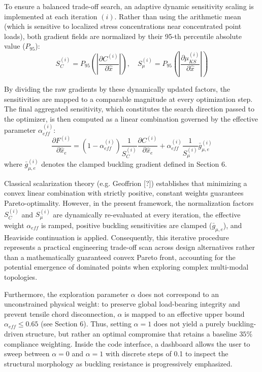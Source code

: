 \documentclass{article}
\begin{document}
To ensure a balanced trade-off search, an adaptive dynamic sensitivity scaling is implemented at each iteration $(i)$. Rather than using the arithmetic mean (which is sensitive to localized stress concentrations near concentrated point loads), both gradient fields are normalized by their 95-th percentile absolute value ($P_{95}$):
\begin{equation}
S_C^{(i)} = P_{95}\left(\left| \frac{\partial C^{(i)}}{\partial \hat{x}} \right|\right), \quad S_\mu^{(i)} = P_{95}\left(\left| \frac{\partial \mu_{KS}^{(i)}}{\partial \hat{x}} \right|\right)
\end{equation}

By dividing the raw gradients by these dynamically updated factors, the sensitivities are mapped to a comparable magnitude at every optimization step. The final aggregated sensitivity, which constitutes the search direction passed to the optimizer, is then computed as a linear combination governed by the effective parameter $\alpha_{eff}^{(i)}$:
\begin{equation}
\frac{\partial F^{(i)}}{\partial \hat{x}_e} = (1 - \alpha_{eff}^{(i)})\frac{1}{S_C^{(i)}}\frac{\partial C^{(i)}}{\partial \hat{x}_e} + \alpha_{eff}^{(i)} \frac{1}{S_\mu^{(i)}}\bar{g}_{\mu, e}^{(i)}
\end{equation}
where $\bar{g}_{\mu, e}^{(i)}$ denotes the clamped buckling gradient defined in Section 6.

Classical scalarization theory (e.g. Geoffrion [?]) establishes that minimizing a convex linear combination with strictly positive, constant weights guarantees Pareto-optimality. However, in the present framework, the normalization factors $S_C^{(i)}$ and $S_\mu^{(i)}$ are dynamically re-evaluated at every iteration, the effective weight $\alpha_{eff}$ is ramped, positive buckling sensitivities are clamped ($\bar{g}_{\mu,e}$), and Heaviside continuation is applied. Consequently, this iterative procedure represents a practical engineering trade-off scan across design alternatives rather than a mathematically guaranteed convex Pareto front, accounting for the potential emergence of dominated points when exploring complex multi-modal topologies.

Furthermore, the exploration parameter $\alpha$ does not correspond to an unconstrained physical weight: to preserve global load-bearing integrity and prevent tensile chord disconnection, $\alpha$ is mapped to an effective upper bound $\alpha_{eff} \leq 0.65$ (see Section 6). Thus, setting $\alpha = 1$ does not yield a purely buckling-driven structure, but rather an optimal compromise that retains a baseline $35\%$ compliance weighting. Inside the code interface, a dashboard allows the user to sweep between $\alpha = 0$ and $\alpha = 1$ with discrete steps of 0.1 to inspect the structural morphology as buckling resistance is progressively emphasized.
\end{document}
